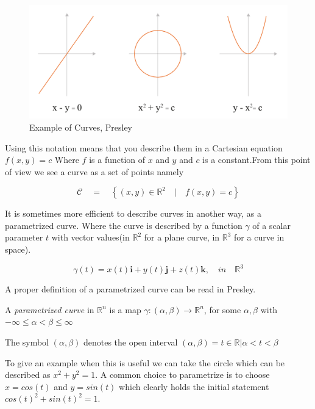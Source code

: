 \begin{figure}[H]
\centering
\includegraphics[width=0.9\linewidth ]{figure/Theory/CurveExample.pdf}  \caption{Example of Curves, Presley }
\end{figure}

Using this notation means that you describe them in a Cartesian equation $f(x,y) = c$
Where $f$ is a function of $x$ and $y$ and $c$ is a constant.From this point of view we see a curve as a set of points namely

$$ \mathcal{C}\quad =\quad \left\{ (x,y) \in \mathbb{R}^2\quad |\quad f(x,y) = c \right\} $$


It is sometimes more efficient to describe curves in another way, as a parametrized curve. Where the curve is described by a function $\gamma$ of a scalar parameter $t$ with vector values(in $\mathbb{R}^2$ for a plane curve, in $\mathbb{R}^3$ for a curve in space). 

\begin{equation}
\gamma(t) = x(t)\textbf{i} +  y(t)\textbf{j}+  z(t)\textbf{k},\quad in\quad \mathbb{R}^3
\end{equation}

A proper definition of a parametrized curve can be read in Presley.

\vspace{5mm} %

A \textit{parametrized curve} in $\mathbb{R}^n$ is a map $\gamma : (\alpha,\beta) \rightarrow \mathbb{R}^n $, for some $\alpha,\beta$ with $-\infty\leqslant\alpha<\beta\leqslant\infty$ 

The symbol $(\alpha,\beta)$ denotes the open interval $(\alpha,\beta) = {t\in \mathbb{R} | \alpha < t < \beta}$

\vspace{5mm} %

To give an example when this is useful we can take the circle which can be described as $x^2+y^2=1$. A common choice to parametrize is to choose $x = cos(t)$ and $y = sin(t)$ which clearly holds the initial statement $cos(t)^2 + sin(t)^2 = 1$.  

